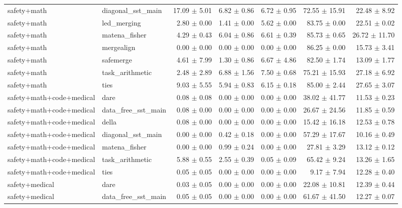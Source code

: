 \documentclass{article}
\begin{document}
\begin{table}[H]
{\begin{tabular}{llrrrrr}
safety+math & diagonal\_sst\_main & 17.09 $\pm$ 5.01 & 6.82 $\pm$ 0.86 & 6.72 $\pm$ 0.95 & 72.55 $\pm$ 15.91 & 22.48 $\pm$ 8.92 \\
safety+math & led\_merging & 2.80 $\pm$ 0.00 & 1.41 $\pm$ 0.00 & 5.62 $\pm$ 0.00 & 83.75 $\pm$ 0.00 & 22.51 $\pm$ 0.02 \\
safety+math & matena\_fisher & 4.29 $\pm$ 0.43 & 6.04 $\pm$ 0.86 & 6.61 $\pm$ 0.39 & 85.73 $\pm$ 0.65 & 26.72 $\pm$ 11.70 \\
safety+math & mergealign & 0.00 $\pm$ 0.00 & 0.00 $\pm$ 0.00 & 0.00 $\pm$ 0.00 & 86.25 $\pm$ 0.00 & 15.73 $\pm$ 3.41 \\
safety+math & safemerge & 4.61 $\pm$ 7.99 & 1.30 $\pm$ 0.86 & 6.67 $\pm$ 4.86 & 82.50 $\pm$ 1.74 & 13.09 $\pm$ 1.77 \\
safety+math & task\_arithmetic & 2.48 $\pm$ 2.89 & 6.88 $\pm$ 1.56 & 7.50 $\pm$ 0.68 & 75.21 $\pm$ 15.93 & 27.18 $\pm$ 6.92 \\
safety+math & ties & 9.03 $\pm$ 5.55 & 5.94 $\pm$ 0.83 & 6.15 $\pm$ 0.18 & 85.00 $\pm$ 2.44 & 27.65 $\pm$ 3.07 \\
safety+math+code+medical & dare & 0.08 $\pm$ 0.08 & 0.00 $\pm$ 0.00 & 0.00 $\pm$ 0.00 & 38.02 $\pm$ 41.77 & 11.53 $\pm$ 0.23 \\
safety+math+code+medical & data\_free\_sst\_main & 0.08 $\pm$ 0.00 & 0.00 $\pm$ 0.00 & 0.00 $\pm$ 0.00 & 26.67 $\pm$ 24.56 & 11.85 $\pm$ 0.59 \\
safety+math+code+medical & della & 0.08 $\pm$ 0.00 & 0.00 $\pm$ 0.00 & 0.00 $\pm$ 0.00 & 15.42 $\pm$ 16.18 & 12.53 $\pm$ 0.78 \\
safety+math+code+medical & diagonal\_sst\_main & 0.00 $\pm$ 0.00 & 0.42 $\pm$ 0.18 & 0.00 $\pm$ 0.00 & 57.29 $\pm$ 17.67 & 10.16 $\pm$ 0.49 \\
safety+math+code+medical & matena\_fisher & 0.00 $\pm$ 0.00 & 0.99 $\pm$ 0.24 & 0.00 $\pm$ 0.00 & 27.81 $\pm$ 3.29 & 13.12 $\pm$ 0.12 \\
safety+math+code+medical & task\_arithmetic & 5.88 $\pm$ 0.55 & 2.55 $\pm$ 0.39 & 0.05 $\pm$ 0.09 & 65.42 $\pm$ 9.24 & 13.26 $\pm$ 1.65 \\
safety+math+code+medical & ties & 0.05 $\pm$ 0.05 & 0.00 $\pm$ 0.00 & 0.00 $\pm$ 0.00 & 9.17 $\pm$ 7.94 & 12.28 $\pm$ 0.40 \\
safety+medical & dare & 0.03 $\pm$ 0.05 & 0.00 $\pm$ 0.00 & 0.00 $\pm$ 0.00 & 22.08 $\pm$ 10.81 & 12.39 $\pm$ 0.44 \\
safety+medical & data\_free\_sst\_main & 0.05 $\pm$ 0.05 & 0.00 $\pm$ 0.00 & 0.00 $\pm$ 0.00 & 61.67 $\pm$ 41.50 & 12.27 $\pm$ 0.07 \\

\end{tabular}}
\end{table}
\end{document}
